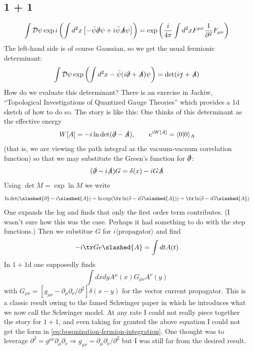 \documentclass{report}
\begin{document}
\subsection{1 + 1}
\begin{equation}\label{eq:bosonization-fermion-integration}
	\int \mathcal{D} \psi \exp i  \left(
		\int d^2 x \left[
			-\bar{\psi}\slashed{\partial}\psi + i \bar{\psi} \slashed{A} \psi
		\right]	\right)
		= \exp \left(
			\frac{i}{4\pi}
			\int d^2 x F^{\mu\nu} \frac{1}{\partial^2} F_{\mu\nu}
		\right)
\end{equation}
The left-hand side is of course Gaussian, so we get the usual fermionic determinant: 
\begin{equation*}
	\int \mathcal{D}\psi \exp\left( \int d^2x -\bar{\psi} (i\slashed{\partial} 
		+ \slashed{A})\psi\right)
		= \det (i\slashed{\gamma} + \slashed{A})
\end{equation*}
How do we evaluate this determinant? There is an exercise in Jackiw, ``Topological 
Investigations of Quantized Gauge Theories'' which provides a 1d sketch of 
how to do so. The story is like this: One thinks of this determinant as 
the effective energy 
\begin{equation*}
	W[A] = -i \ln \det( \slashed{\partial} - \slashed{A}), \qquad 
	e^{iW[A]} = \langle 0\vert 0 \rangle _A
\end{equation*}
(that is, we are viewing the path integral as the vacuum-vacuum correlation function)
so that we may substitute the Green's function for $ \slashed{\partial} $: 
\begin{equation*}
	(\slashed{\partial} - i\slashed{A}) G = \delta(x) - iG\slashed{A}
\end{equation*}
Using $ \det M = \exp \ln M $ we write 
\begin{equation*}
	\ln \det(\slashed{\partial} - i\slashed{A}) 
		= \ln \exp(\tr \ln (\delta - iG\slashed{A}))
		= \tr \ln(\delta - iG \slashed{A})
\end{equation*}
One expands the log and finds that only the first order term contributes.
{\color{myred}(I wasn't sure how this was the case.  Perhaps it had something to
do with the step functions.)} Then we substitue $ G $ for $ i\langle\text{propagator}\rangle $
and find
\begin{equation*}
	-i\tr G e\slashed{A} = \int dt A(t)
\end{equation*}
In $ 1+1 $d one supposedly finds 
\begin{equation*}
	\int dx dy A^\mu(x) G_{\mu\nu}A^\nu(y)
\end{equation*}
with $ G_{\mu\nu} = [g_{\mu\nu} - \partial_\mu\partial_\nu/\partial^2]\delta(x-y)$
for the vector current propagator. This is a classic result owing to the famed 
Schwinger paper in which he introduces what we now call the Schwinger model. 
At any rate I could not really piece together the story for $ 1+1 $, and 
even taking for granted the above equation I could not get the form in 
\cref{eq:bosonization-fermion-integration}. One thought was to leverage 
$ \partial^2 = g^{\mu\nu}\partial_\mu \partial_\nu \Longrightarrow 
g_{\mu\nu} = \partial_\mu\partial_\nu/\partial^2 $ but I was still far from 
the desired result.
\end{document}
